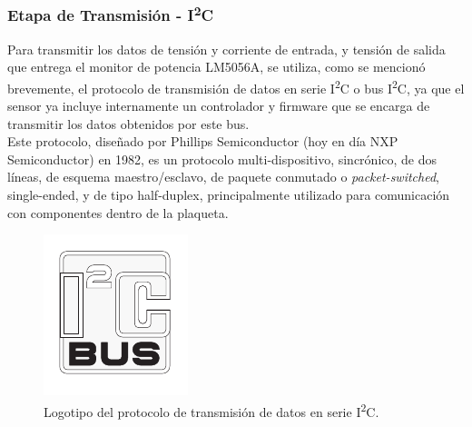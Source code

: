 \subsubsection{Etapa de Transmisión - I\textsuperscript{2}C}

Para transmitir los datos de tensión y corriente de entrada, y tensión de salida que entrega el monitor de potencia LM5056A, se utiliza, como se mencionó brevemente, el protocolo de transmisión de datos en serie I\textsuperscript{2}C o bus I\textsuperscript{2}C, ya que el sensor ya incluye internamente un controlador y firmware que se encarga de transmitir los datos obtenidos por este bus.\\

Este protocolo, diseñado por Phillips Semiconductor (hoy en día NXP Semiconductor) en 1982, es un protocolo multi-dispositivo, sincrónico, de dos líneas, de esquema maestro/esclavo, de paquete conmutado o \textit{packet-switched}, single-ended, y de tipo half-duplex, principalmente utilizado para comunicación con componentes dentro de la plaqueta.\\

\begin{figure}[h]
    \centering
    \includegraphics[scale=0.9]{Imagenes/Logo I2C.pdf}
    \caption{Logotipo del protocolo de transmisión de datos en serie I\textsuperscript{2}C.}
    \label{logo_I2C}
\end{figure}

